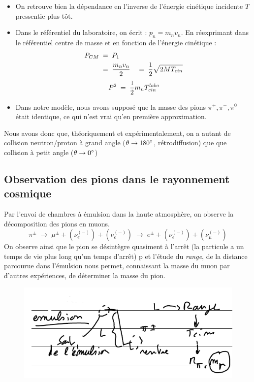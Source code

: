 \begin{itemize}[label = $\bullet$]
    \item On retrouve bien la dépendance en l'inverse de l'énergie cinétique incidente $T$ pressentie plus tôt.
    \item Dans le référentiel du laboratoire, on écrit : $p_n = m_n v_n$. En réexprimant dans le référentiel centre de masse et en fonction de l'énergie cinétique :
    \begin{align*}
        P_{CM} & \; = \; P_1\\
        &\; = \; \dfrac{m_n v_n}{2}
        & \; = \;\dfrac{1}{2}\sqrt{2M T_{cin}}
    \end{align*}
    \begin{equation*}
        P^2 \; = \; \dfrac{1}{2}m_n T_{cin}^{labo}
    \end{equation*}
    \item Dans notre modèle, nous avons supposé que la masse des pions $\pi^+,\pi^-,\pi^0$ était identique, ce qui n'est vrai qu'en première approximation.
\end{itemize}
Nous avons donc que, théoriquement et expérimentalement, on a autant de collision neutron/proton à grand angle ($\theta \rightarrow 180\degree$, rétrodiffusion) que que collision à petit angle ($\theta \rightarrow 0\degree$) 


\subsection{Observation des pions dans le rayonnement cosmique}


Par l'envoi de chambres à émulsion dans la haute atmosphère, on observe la décomposition des pions en muons. 
\begin{equation*}
    \pi^\pm \; \longrightarrow \; \mu^\pm +(\nu^{(-)}_e) + (\nu^{(-)}_e)\; \longrightarrow \; e^\pm  + (\nu_e^{(-)})  + (\nu_\mu^{(-)})
\end{equation*}
On observe ainsi que le pion se désintègre quasiment à l'arrêt (la particule a un temps de vie plus long qu'un temps d'arrêt)   p et l'étude du \emph{range}, de la distance parcourue dans l'émulsion nous permet, connaissant la masse du muon par d'autres expériences, de déterminer la masse du pion.\\


\begin{figure}[H]
    \centering
    \includegraphics{Images4/masse_pion.PNG}
\end{figure}


